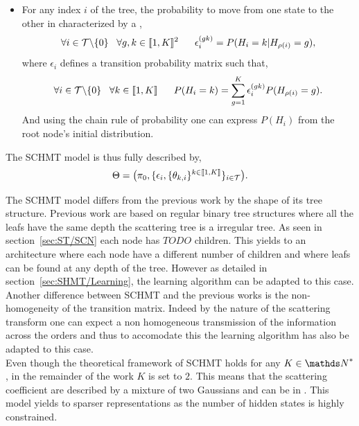 \documentclass[a4paper,11pt]{report}
\begin{document}
\begin{itemize}
			\item For any index $i$ of the tree, the probability to move from one state to the other in characterized by a ,
				\begin{equation}
					\forall i \in \mathcal{T} \backslash \{ 0 \} \;\;\; \forall g,k \in \llbracket1,K\rrbracket^{2}
					\;\;\;\;\;\; \epsilon_{i}^{(gk)} = P(H_{i}= k | H_{\rho(i)}=g), 
					\label{eq:SCHMT - Transition matrix}
				\end{equation}
				where $\epsilon_{i}$ defines a transition probability matrix such that,
				\begin{equation}
				  \forall i \in \mcalT \backslash\{0\} \;\;\;  \forall k \in \llbracket1,K\rrbracket
					\;\;\;\;\;\;  P(H_{i}=k) = \sum_{g=1}^{K} \epsilon_{i}^{(gk)} P(H_{\rho(i)}=g). %
				  \label{eq:SCHMT - State proba 1}
				\end{equation}
				And using the chain rule of probability one can express $P(H_{i})$ from the root node's initial distribution.\\
		\end{itemize}
		
		The SCHMT model is thus fully described by,
		\begin{equation}
			\Theta = \big(\pi_{0}, \{ \epsilon_{i}, \{ \theta_{k,i} \}^{k\in\llbracket1,K\rrbracket} \}_{i\in\mathcal{T}}\big).
			\label{eq:SCHMT - parameters}
		\end{equation}
		
		
    The SCHMT model differs from the previous work by the shape of its tree structure. Previous work are based on regular binary tree structures where all the leafs have the same depth the scattering tree is a irregular tree. As seen in section~\ref{sec:ST/SCN} each node has $TODO$ children. This yields to an architecture where each node have a different number of children and where leafs can be found at any depth of the tree. However as detailed in section~\ref{sec:SHMT/Learning}, the learning algorithm can be adapted to this case. Another difference between SCHMT and the previous works is the non-homogeneity of the transition matrix. Indeed by the nature of the scattering transform one can expect a non homogeneous transmission of the information across the orders and thus to accomodate this the learning algorithm has also be adapted to this case.\\
    
    Even though the theoretical framework of SCHMT holds for any $K \in \dsN^{\ast}$, in the remainder of the work $K$ is set to $2$. This means that the scattering coefficient are described by a mixture of two Gaussians and can be in . This model yields to sparser representations as the number of hidden states is highly constrained.
    
\end{document}
